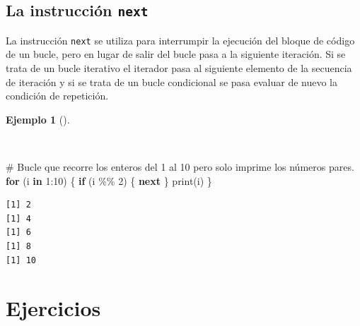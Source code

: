 \documentclass[
  a4paper,
]{scrreport}
\newenvironment{Shaded}{\begin{snugshade}}{\end{snugshade}}
\newcommand{\CommentTok}[1]{\textcolor[rgb]{0.37,0.37,0.37}{#1}}
\newcommand{\ControlFlowTok}[1]{\textcolor[rgb]{0.00,0.23,0.31}{\textbf{#1}}}
\newcommand{\DecValTok}[1]{\textcolor[rgb]{0.68,0.00,0.00}{#1}}
\newcommand{\FunctionTok}[1]{\textcolor[rgb]{0.28,0.35,0.67}{#1}}
\newcommand{\NormalTok}[1]{\textcolor[rgb]{0.00,0.23,0.31}{#1}}
\newcommand{\SpecialCharTok}[1]{\textcolor[rgb]{0.37,0.37,0.37}{#1}}
\theoremstyle{definition}
\theoremstyle{definition}
\newtheorem{example}{Ejemplo}[chapter]
\theoremstyle{remark}
\begin{document}
\subsection{\texorpdfstring{La instrucción
\texttt{next}}{La instrucción next}}\label{la-instrucciuxf3n-next}

La instrucción \texttt{next} se utiliza para interrumpir la ejecución
del bloque de código de un bucle, pero en lugar de salir del bucle pasa
a la siguiente iteración. Si se trata de un bucle iterativo el iterador
pasa al siguiente elemento de la secuencia de iteración y si se trata de
un bucle condicional se pasa evaluar de nuevo la condición de
repetición.

\begin{example}[]\protect\hypertarget{exm-continuacion-bucle-next}{}\label{exm-continuacion-bucle-next}

~

\begin{Shaded}
\begin{Highlighting}[]
\CommentTok{\# Bucle que recorre los enteros del 1 al 10 pero solo imprime los números pares.}
\ControlFlowTok{for}\NormalTok{ (i }\ControlFlowTok{in} \DecValTok{1}\SpecialCharTok{:}\DecValTok{10}\NormalTok{) \{}
  \ControlFlowTok{if}\NormalTok{ (i }\SpecialCharTok{\%\%} \DecValTok{2}\NormalTok{) \{}
    \ControlFlowTok{next}
\NormalTok{  \}}
  \FunctionTok{print}\NormalTok{(i)}
\NormalTok{\}}
\end{Highlighting}
\end{Shaded}

\begin{verbatim}
[1] 2
[1] 4
[1] 6
[1] 8
[1] 10
\end{verbatim}

\end{example}

\section{Ejercicios}\label{ejercicios-2}
\end{document}
